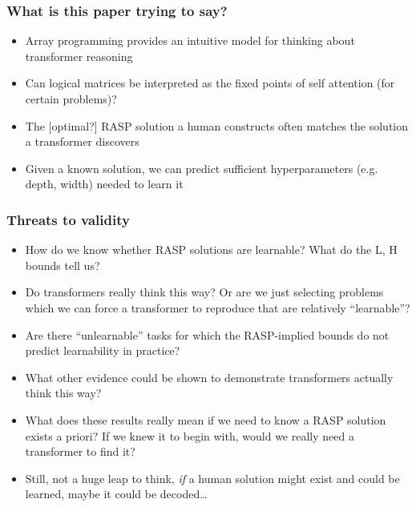 \documentclass[mathserif,notheorems]{beamer}
\theoremstyle{plain} %
\theoremstyle{definition} %
\begin{document}

  \begin{frame}
    \frametitle{What is this paper trying to say?}
    \begin{itemize}
      \item Array programming provides an intuitive model for thinking about transformer reasoning
      \item Can logical matrices be interpreted as the fixed points of self attention (for certain problems)?
      \item The [optimal?] RASP solution a human constructs often matches the solution a transformer discovers
      \item Given a known solution, we can predict sufficient hyperparameters (e.g. depth, width) needed to learn it
    \end{itemize}
  \end{frame}

  \begin{frame}
    \frametitle{Threats to validity}
    \begin{itemize}
      \item How do we know whether RASP solutions are learnable? What do the L, H bounds tell us?
      \item Do transformers really think this way? Or are we just selecting problems which we can force a transformer to reproduce that are relatively ``learnable''?
      \item Are there ``unlearnable'' tasks for which the RASP-implied bounds do not predict learnability in practice?
      \item What other evidence could be shown to demonstrate transformers actually think this way?
      \item What does these results really mean if we need to know a RASP solution exists a priori? If we knew it to begin with, would we really need a transformer to find it?
      \item Still, not a huge leap to think, \textit{if} a human solution might exist and could be learned, maybe it could be decoded\ldots
    \end{itemize}
  \end{frame}
\end{document}
